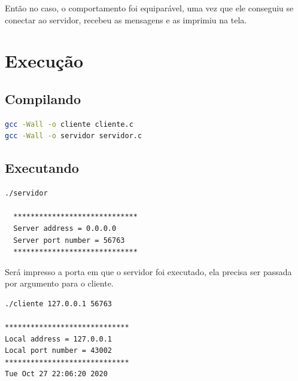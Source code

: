 \documentclass[12pt,a4paper]{report}
\begin{document}
Então no caso, o comportamento foi equiparável, uma vez que ele conseguiu se conectar ao servidor, recebeu as mensagens e as imprimiu na tela.


\section{Execução}

\subsection{Compilando}
\begin{lstlisting}[language=bash]
gcc -Wall -o cliente cliente.c
gcc -Wall -o servidor servidor.c
\end{lstlisting}

\subsection{Executando}
\begin{lstlisting}[language=bash]
  ./servidor 

  *****************************
  Server address = 0.0.0.0
  Server port number = 56763
  *****************************  
\end{lstlisting}

Será impresso a porta em que o servidor foi executado, ela precisa ser passada por argumento para o cliente.


\begin{lstlisting}[language=bash]
./cliente 127.0.0.1 56763

*****************************
Local address = 127.0.0.1
Local port number = 43002
*****************************
Tue Oct 27 22:06:20 2020
\end{lstlisting}
\end{document}
